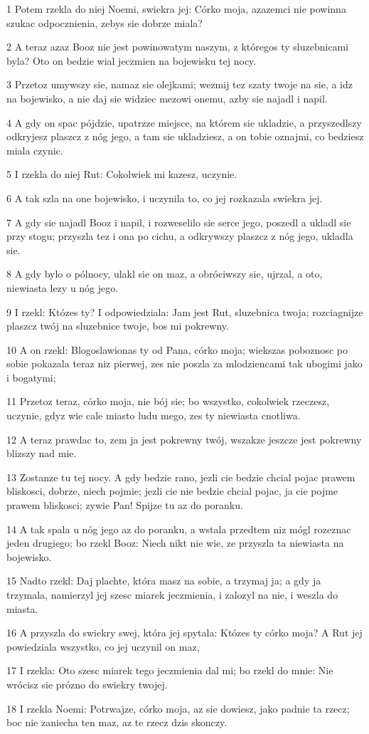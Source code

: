 \par 1 Potem rzekla do niej Noemi, swiekra jej: Córko moja, azazemci nie powinna szukac odpocznienia, zebys sie dobrze miala?
\par 2 A teraz azaz Booz nie jest powinowatym naszym, z któregos ty sluzebnicami byla? Oto on bedzie wial jeczmien na bojewisku tej nocy.
\par 3 Przetoz umywszy sie, namaz sie olejkami; wezmij tez szaty twoje na sie, a idz na bojewisko, a nie daj sie widziec mezowi onemu, azby sie najadl i napil.
\par 4 A gdy on spac pójdzie, upatrzze miejsce, na którem sie ukladzie, a przyszedlszy odkryjesz plaszcz z nóg jego, a tam sie ukladziesz, a on tobie oznajmi, co bedziesz miala czynic.
\par 5 I rzekla do niej Rut: Cokolwiek mi kazesz, uczynie.
\par 6 A tak szla na one bojewisko, i uczynila to, co jej rozkazala swiekra jej.
\par 7 A gdy sie najadl Booz i napil, i rozweselilo sie serce jego, poszedl a ukladl sie przy stogu; przyszla tez i ona po cichu, a odkrywszy plaszcz z nóg jego, ukladla sie.
\par 8 A gdy bylo o pólnocy, ulakl sie on maz, a obróciwszy sie, ujrzal, a oto, niewiasta lezy u nóg jego.
\par 9 I rzekl: Któzes ty? I odpowiedziala: Jam jest Rut, sluzebnica twoja; rozciagnijze plaszcz twój na sluzebnice twoje, bos mi pokrewny.
\par 10 A on rzekl: Blogoslawionas ty od Pana, córko moja; wiekszas poboznosc po sobie pokazala teraz niz pierwej, zes nie poszla za mlodziencami tak ubogimi jako i bogatymi;
\par 11 Przetoz teraz, córko moja, nie bój sie; bo wszystko, cokolwiek rzeczesz, uczynie, gdyz wie cale miasto ludu mego, zes ty niewiasta cnotliwa.
\par 12 A teraz prawdac to, zem ja jest pokrewny twój, wszakze jeszcze jest pokrewny blizszy nad mie.
\par 13 Zostanze tu tej nocy. A gdy bedzie rano, jezli cie bedzie chcial pojac prawem bliskosci, dobrze, niech pojmie; jezli cie nie bedzie chcial pojac, ja cie pojme prawem bliskosci; zywie Pan! Spijze tu az do poranku.
\par 14 A tak spala u nóg jego az do poranku, a wstala przedtem niz mógl rozeznac jeden drugiego; bo rzekl Booz: Niech nikt nie wie, ze przyszla ta niewiasta na bojewisko.
\par 15 Nadto rzekl: Daj plachte, która masz na sobie, a trzymaj ja; a gdy ja trzymala, namierzyl jej szesc miarek jeczmienia, i zalozyl na nie, i weszla do miasta.
\par 16 A przyszla do swiekry swej, która jej spytala: Któzes ty córko moja? A Rut jej powiedziala wszystko, co jej uczynil on maz,
\par 17 I rzekla: Oto szesc miarek tego jeczmienia dal mi; bo rzekl do mnie: Nie wrócisz sie prózno do swiekry twojej.
\par 18 I rzekla Noemi: Potrwajze, córko moja, az sie dowiesz, jako padnie ta rzecz; boc nie zaniecha ten maz, az te rzecz dzis skonczy.

